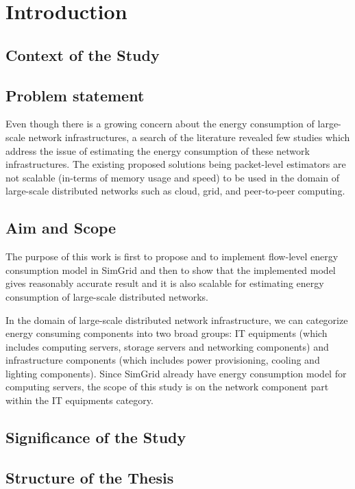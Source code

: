 \chapter{Introduction}
\label{chapter:intro}

\section{Context of the Study}	 

\section{Problem statement}
Even though there is a growing concern about the energy consumption of large-scale network infrastructures, a search of the literature revealed few studies which address the issue of estimating the energy consumption of these network infrastructures. The existing proposed solutions being packet-level estimators are not scalable (in-terms of memory usage and speed) to be used in the domain of large-scale distributed networks such as cloud, grid, and peer-to-peer computing. 

\section{Aim and Scope}

The purpose of this work is first to propose and to implement flow-level energy consumption model in SimGrid and then to show that the implemented model gives reasonably accurate result and it is also scalable for estimating energy consumption of large-scale distributed networks.

In the domain of large-scale distributed network infrastructure, we can categorize energy consuming components into two broad groups: IT equipments (which includes computing servers, storage servers and networking components) and infrastructure components (which includes power provisioning, cooling and lighting components). Since SimGrid already have energy consumption model for computing servers, the scope of this study is on the network component part within the IT equipments category.

\section{Significance of the Study}

\section{Structure of the Thesis}
\label{section:structure} 


